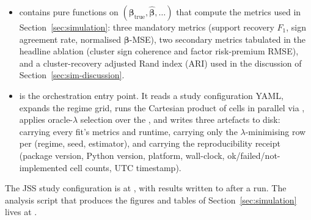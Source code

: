 \documentclass[article]{jss}
\begin{document}
\begin{appendix}
\begin{itemize}
	 interface and
	registers each of the  configurations of the
	Section~\ref{sec:simulation} ablation, along with stubs for external
	competitors ('s , ,
	) that can be wired in when their dependencies are
	installed.
	\item {} contains pure functions on
	$(\bm{\beta}_{\mathrm{true}}, \hat{\bm{\beta}}, \ldots)$ that
	compute the metrics used in Section~\ref{sec:simulation}: three
	mandatory metrics (support recovery $F_1$, sign agreement rate,
	normalised $\bm{\beta}$-MSE), two secondary metrics tabulated in the
	headline ablation (cluster sign coherence and factor risk-premium
	RMSE), and a cluster-recovery adjusted Rand index (ARI) used in the
	discussion of Section~\ref{sec:sim-discussion}.
	\item {} is the orchestration entry point. It
	reads a study configuration YAML, expands the regime grid, runs the
	Cartesian product of cells in parallel via  \citep{joblib},
	applies oracle-$\lambda$ selection over the , and
	writes three artefacts to disk:  carrying
	every fit's metrics and runtime, 
	carrying only the $\lambda$-minimising row per
	(regime, seed, estimator), and  carrying the
	reproducibility receipt (package version, Python version, platform,
	wall-clock, ok/failed/not-implemented cell counts, UTC timestamp).
\end{itemize}
%
The JSS study
configuration is at , with results written
to  after a run. The analysis script that
produces the figures and tables of Section~\ref{sec:simulation} lives
at .


\end{appendix}
\end{document}
